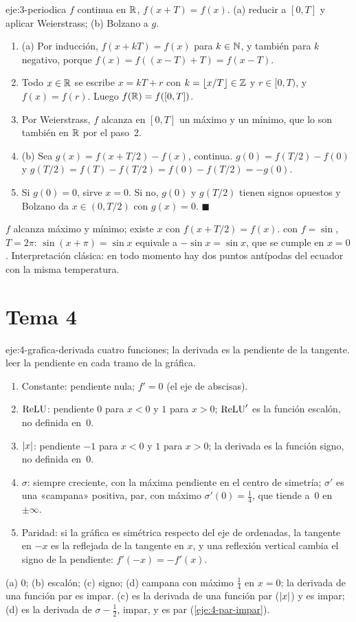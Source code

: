 \begin{solucion}{eje:3-periodica}
\datos $f$ continua en $\mathbb{R}$, $f(x+T)=f(x)$.
\planteamiento (a) reducir a $[0,T]$ y aplicar Weierstrass; (b) Bolzano a $g$.
\pasos
\begin{enumerate}[label=\arabic*.]
  \item (a) Por inducción, $f(x+kT)=f(x)$ para $k\in\mathbb{N}$, y también para $k$ negativo, porque $f(x)=f((x-T)+T)=f(x-T)$.
  \item Todo $x\in\mathbb{R}$ se escribe $x=kT+r$ con $k=\lfloor x/T\rfloor\in\mathbb{Z}$ y $r\in[0,T)$, y $f(x)=f(r)$. Luego $f(\mathbb{R})=f([0,T])$.
  \item Por Weierstrass, $f$ alcanza en $[0,T]$ un máximo y un mínimo, que lo son también en $\mathbb{R}$ por el paso~2.
  \item (b) Sea $g(x)=f(x+T/2)-f(x)$, continua. $g(0)=f(T/2)-f(0)$ y $g(T/2)=f(T)-f(T/2)=f(0)-f(T/2)=-g(0)$.
  \item Si $g(0)=0$, sirve $x=0$. Si no, $g(0)$ y $g(T/2)$ tienen signos opuestos y Bolzano da $x\in(0,T/2)$ con $g(x)=0$. \hfill$\blacksquare$
\end{enumerate}
\resultado $f$ alcanza máximo y mínimo; existe $x$ con $f(x+T/2)=f(x)$.
\comprobacion con $f=\sin$, $T=2\pi$: $\sin(x+\pi)=\sin x$ equivale a $-\sin x=\sin x$, que se cumple en $x=0$. Interpretación clásica: en todo momento hay dos puntos antípodas del ecuador con la misma temperatura.
\end{solucion}
\section{Tema 4}

\begin{solucion}{eje:4-grafica-derivada}
\datos cuatro funciones; la derivada es la pendiente de la tangente.
\planteamiento leer la pendiente en cada tramo de la gráfica.
\pasos
\begin{enumerate}[label=(\alph*)]
  \item Constante: pendiente nula; $f'=0$ (el eje de abscisas).
  \item $\operatorname{ReLU}$: pendiente $0$ para $x<0$ y $1$ para $x>0$; $\operatorname{ReLU}'$ es la función escalón, no definida en~0.
  \item $\lvert x\rvert$: pendiente $-1$ para $x<0$ y $1$ para $x>0$; la derivada es la función signo, no definida en~0.
  \item $\sigma$: siempre creciente, con la máxima pendiente en el centro de simetría; $\sigma'$ es una «campana» positiva, par, con máximo $\sigma'(0)=\frac14$, que tiende a~0 en $\pm\infty$.
  \item Paridad: si la gráfica es simétrica respecto del eje de ordenadas, la tangente en $-x$ es la reflejada de la tangente en $x$, y una reflexión vertical cambia el signo de la pendiente: $f'(-x)=-f'(x)$.
\end{enumerate}
\resultado (a) $0$; (b) escalón; (c) signo; (d) campana con máximo $\frac14$ en $x=0$; la derivada de una función par es impar.
\comprobacion (c) es la derivada de una función par ($\lvert x\rvert$) y es impar; (d) es la derivada de $\sigma-\frac12$, impar, y es par (\cref{eje:4-par-impar}).
\end{solucion}

